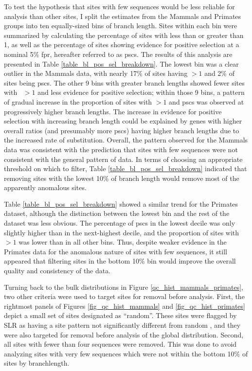 To test the hypothesis that sites with few \ngap sequences would be
less reliable for analysis than other sites, I split the \sw estimates
from the Mammals and Primates groups into ten equally-sized bins of
\ngap branch length. Sites within each bin were summarized by
calculating the percentage of sites with \omgml less than or greater
than 1, as well as the percentage of sites showing evidence for
positive selection at a nominal 5\% \ac{fpr}, hereafter referred to as
\acp{psc}. The results of this analysis are presented in Table
\ref{table_bl_pos_sel_breakdown}. The lowest bin was a clear outlier
in the Mammals data, with nearly 17\% of sites having \omgml$>1$ and
2\% of sites being \acp{psc}. The other 9 bins with greater \ngap
branch lengths showed fewer sites with \omg~$>1$ and less evidence for
positive selection; within those 9 bins, a pattern of gradual increase
in the proportion of sites with {{\omgml$>1$}} and \acp{psc} was observed
at progressively higher \ngap branch lengths. The increase in evidence
for positive selection with increasing \ngap branch length could be
explained by genes with higher overall \dnds ratios (and presumably
more \acp{psc}) having higher branch lengths due to the increased rate
of \nsyn substitution. Overall, the pattern observed for the Mammals
data was consistent with the prediction that sites with few \ngap
sequences were not consistent with the general pattern of \sw data. In
terms of choosing an appropriate threshold on which to filter, Table
\ref{table_bl_pos_sel_breakdown} indicated that removing sites with
the lowest 10\% of \ngap branch length would remove most of the
apparently anomalous sites.

Table \ref{table_bl_pos_sel_breakdown} showed a similar trend for the
Primates dataset, although the distinction between the lowest bin and
the rest of the dataset was less obvious. The percentage of \acp{psc}
in the lowest decile was only slightly higher than in the next-highest
decile, and the proportion of sites with \omgml$>1$ was lower than in
all other bins. Thus, despite weaker evidence in the Primates data for
the anomalous nature of sites with few \ngap sequences, it still
appeared that filtering sites in the bottom 10\% bin would improve the
overall quality and consistency of the data.

Turning back to the bulk distributions in Figure
\ref{qc_hist_mammals_primates}, two other criteria were used to target
sites for removal before analysis. First, the rightmost panels of
Figures \ref{fig_qc_hist_mammals} and \ref{fig_qc_hist_primates}
depict a small set of sites designated as ``random''. These sites were
flagged by SLR as having a site pattern not significantly different
from random \citep{Massingham2005}, and they were also targeted for
removal before analysis of the global distribution. Second, all sites
with fewer than four \ngap sequences were removed. This was done to
avoid analyzing sites with very few sequences which were not within
the bottom 10\% of sites by \ngap branchlength.

